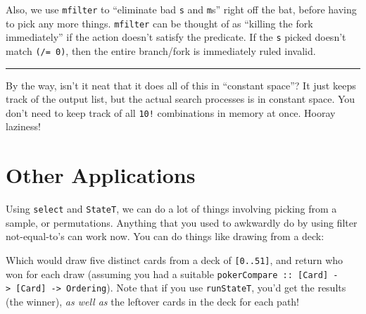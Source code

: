 \documentclass[]{article}
\newenvironment{Shaded}{}{}
\newcommand{\DataTypeTok}[1]{\textcolor[rgb]{0.56,0.13,0.00}{#1}}
\newcommand{\DecValTok}[1]{\textcolor[rgb]{0.25,0.63,0.44}{#1}}
\newcommand{\FunctionTok}[1]{\textcolor[rgb]{0.02,0.16,0.49}{#1}}
\newcommand{\KeywordTok}[1]{\textcolor[rgb]{0.00,0.44,0.13}{\textbf{#1}}}
\newcommand{\NormalTok}[1]{#1}
\newcommand{\OperatorTok}[1]{\textcolor[rgb]{0.40,0.40,0.40}{#1}}
\newcommand{\OtherTok}[1]{\textcolor[rgb]{0.00,0.44,0.13}{#1}}
\begin{document}
Also, we use \texttt{mfilter} to ``eliminate bad \texttt{s} and \texttt{m}s''
right off the bat, before having to pick any more things. \texttt{mfilter} can
be thought of as ``killing the fork immediately'' if the action doesn't satisfy
the predicate. If the \texttt{s} picked doesn't match \texttt{(/=\ 0)}, then the
entire branch/fork is immediately ruled invalid.

\begin{center}\rule{0.5\linewidth}{\linethickness}\end{center}

By the way, isn't it neat that it does all of this in ``constant space''? It
just keeps track of the output list, but the actual search processes is in
constant space. You don't need to keep track of all \texttt{10!} combinations in
memory at once. Hooray laziness!

\hypertarget{other-applications}{%
\section{Other Applications}\label{other-applications}}

Using \texttt{select} and \texttt{StateT}, we can do a lot of things involving
picking from a sample, or permutations. Anything that you used to awkwardly do
by using filter not-equal-to's can work now. You can do things like drawing from
a deck:

\begin{Shaded}
\end{Shaded}

Which would draw five distinct cards from a deck of \texttt{{[}0..51{]}}, and
return who won for each draw (assuming you had a suitable
\texttt{pokerCompare\ ::\ {[}Card{]}\ -\textgreater{}\ {[}Card{]}\ -\textgreater{}\ Ordering}).
Note that if you use \texttt{runStateT}, you'd get the results (the winner),
\emph{as well as} the leftover cards in the deck for each path!
\end{document}
